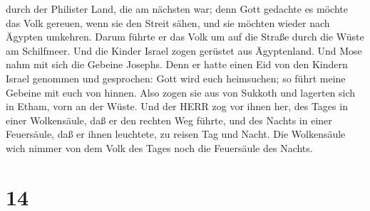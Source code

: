 durch der Philister Land, die am nächsten war; denn Gott gedachte es
möchte das Volk gereuen, wenn sie den Streit sähen, und sie möchten
wieder nach Ägypten umkehren.  Darum führte er das Volk um
auf die Straße durch die Wüste am Schilfmeer. Und die Kinder Israel
zogen gerüstet aus Ägyptenland.  Und Mose nahm mit sich die
Gebeine Josephs. Denn er hatte einen Eid von den Kindern Israel genommen
und gesprochen: Gott wird euch heimsuchen; so führt meine Gebeine mit
euch von hinnen.  Also zogen sie aus von Sukkoth und
lagerten sich in Etham, vorn an der Wüste.  Und der HERR
zog vor ihnen her, des Tages in einer Wolkensäule, daß er den rechten
Weg führte, und des Nachts in einer Feuersäule, daß er ihnen leuchtete,
zu reisen Tag und Nacht.  Die Wolkensäule wich nimmer von
dem Volk des Tages noch die Feuersäule des Nachts.

\hypertarget{section-13}{%
\section{14}\label{section-13}}

